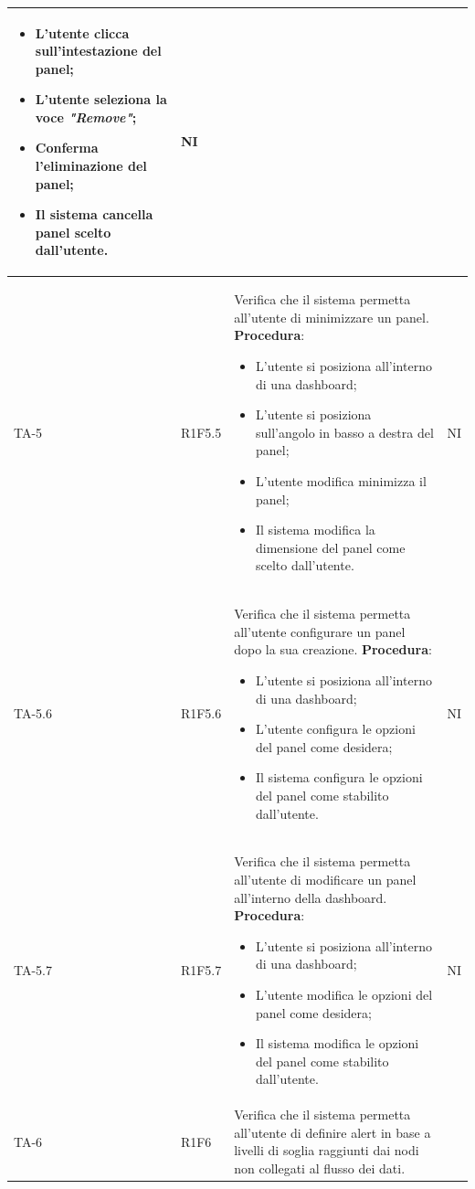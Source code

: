 \begin{longtable}{|C{2.5cm}|C{2.5cm}|L{6.5cm}|C{1.5cm}|}
\begin{itemize}
		\item L'utente clicca sull'intestazione del panel;
		\item L'utente seleziona la voce \emph{"Remove"};
		\item Conferma l'eliminazione del panel;
		\item Il sistema cancella panel scelto dall'utente.
	\end{itemize}
	 & {NI}\\
	\hline
	{TA-5} & {R1F5.5} & 
	Verifica che il sistema permetta all'utente di minimizzare un panel.
	\textbf{Procedura}:
	\begin{itemize}		
		\item L'utente si posiziona all'interno di una dashboard;
		\item L'utente si posiziona sull'angolo in basso a destra del panel;
		\item L'utente modifica minimizza il panel;
		\item Il sistema modifica la dimensione del panel come scelto dall'utente.
	\end{itemize}
	 & {NI}\\
	\hline
	{TA-5.6} & {R1F5.6} & 
	Verifica che il sistema permetta all'utente configurare un panel dopo la sua creazione.
	\textbf{Procedura}:
	\begin{itemize}		
		\item L'utente si posiziona all'interno di una dashboard;
		\item L'utente configura le opzioni del panel come desidera;
		\item Il sistema configura le opzioni del panel come stabilito dall'utente.
	\end{itemize}
	 & {NI}\\
	\hline
	{TA-5.7} & {R1F5.7} & 
	Verifica che il sistema permetta all'utente di modificare un panel all'interno della dashboard.
	\textbf{Procedura}:
	\begin{itemize}		
		\item L'utente si posiziona all'interno di una dashboard;
		\item L'utente modifica le opzioni del panel come desidera;
		\item Il sistema modifica le opzioni del panel come stabilito dall'utente.
	\end{itemize}
	 & {NI}\\
	\hline
	{TA-6} & {R1F6} & 
	Verifica che il sistema permetta all'utente di definire alert in base a livelli di soglia raggiunti dai nodi non collegati al flusso dei dati.

\end{longtable}
